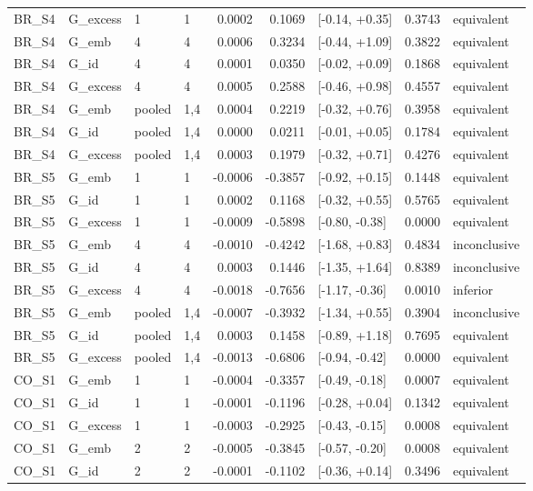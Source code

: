 \begin{tabular}{llllrrlrl}
BR\_S4 & G\_excess & 1 & 1 & 0.0002 & 0.1069 & [-0.14, +0.35] & 0.3743 & equivalent \\
BR\_S4 & G\_emb & 4 & 4 & 0.0006 & 0.3234 & [-0.44, +1.09] & 0.3822 & equivalent \\
BR\_S4 & G\_id & 4 & 4 & 0.0001 & 0.0350 & [-0.02, +0.09] & 0.1868 & equivalent \\
BR\_S4 & G\_excess & 4 & 4 & 0.0005 & 0.2588 & [-0.46, +0.98] & 0.4557 & equivalent \\
BR\_S4 & G\_emb & pooled & 1,4 & 0.0004 & 0.2219 & [-0.32, +0.76] & 0.3958 & equivalent \\
BR\_S4 & G\_id & pooled & 1,4 & 0.0000 & 0.0211 & [-0.01, +0.05] & 0.1784 & equivalent \\
BR\_S4 & G\_excess & pooled & 1,4 & 0.0003 & 0.1979 & [-0.32, +0.71] & 0.4276 & equivalent \\
BR\_S5 & G\_emb & 1 & 1 & -0.0006 & -0.3857 & [-0.92, +0.15] & 0.1448 & equivalent \\
BR\_S5 & G\_id & 1 & 1 & 0.0002 & 0.1168 & [-0.32, +0.55] & 0.5765 & equivalent \\
BR\_S5 & G\_excess & 1 & 1 & -0.0009 & -0.5898 & [-0.80, -0.38] & 0.0000 & equivalent \\
BR\_S5 & G\_emb & 4 & 4 & -0.0010 & -0.4242 & [-1.68, +0.83] & 0.4834 & inconclusive \\
BR\_S5 & G\_id & 4 & 4 & 0.0003 & 0.1446 & [-1.35, +1.64] & 0.8389 & inconclusive \\
BR\_S5 & G\_excess & 4 & 4 & -0.0018 & -0.7656 & [-1.17, -0.36] & 0.0010 & inferior \\
BR\_S5 & G\_emb & pooled & 1,4 & -0.0007 & -0.3932 & [-1.34, +0.55] & 0.3904 & inconclusive \\
BR\_S5 & G\_id & pooled & 1,4 & 0.0003 & 0.1458 & [-0.89, +1.18] & 0.7695 & equivalent \\
BR\_S5 & G\_excess & pooled & 1,4 & -0.0013 & -0.6806 & [-0.94, -0.42] & 0.0000 & equivalent \\
CO\_S1 & G\_emb & 1 & 1 & -0.0004 & -0.3357 & [-0.49, -0.18] & 0.0007 & equivalent \\
CO\_S1 & G\_id & 1 & 1 & -0.0001 & -0.1196 & [-0.28, +0.04] & 0.1342 & equivalent \\
CO\_S1 & G\_excess & 1 & 1 & -0.0003 & -0.2925 & [-0.43, -0.15] & 0.0008 & equivalent \\
CO\_S1 & G\_emb & 2 & 2 & -0.0005 & -0.3845 & [-0.57, -0.20] & 0.0008 & equivalent \\
CO\_S1 & G\_id & 2 & 2 & -0.0001 & -0.1102 & [-0.36, +0.14] & 0.3496 & equivalent \\

\end{tabular}
